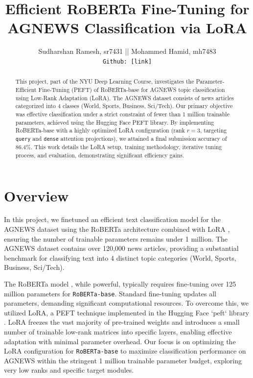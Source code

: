 \documentclass[twoside, 11pt]{article}
\begin{document}
\title{Efficient RoBERTa Fine-Tuning for AGNEWS Classification via LoRA}
\author{Sudharshan Ramesh, sr7431 ||
Mohammed Hamid, mh7483\\
\texttt{Github: [link]}
}
\maketitle

\begin{abstract}
This project, part of the NYU Deep Learning Course, investigates the Parameter-Efficient Fine-Tuning (PEFT) of RoBERTa-base for AGNEWS topic classification using Low-Rank Adaptation (LoRA). The AGNEWS dataset consists of news articles categorized into 4 classes (World, Sports, Business, Sci/Tech). Our primary objective was effective classification under a strict constraint of fewer than 1 million trainable parameters, achieved using the Hugging Face PEFT library. By implementing RoBERTa-base with a highly optimized LoRA configuration (rank $r=3$, targeting \texttt{query} and \texttt{dense} attention projections), we attained a final submission accuracy of 86.4\%. This work details the LoRA setup, training methodology, iterative tuning process, and evaluation, demonstrating significant efficiency gains.
\end{abstract}

\section{Overview}
\label{sec:intro}
In this project, we finetuned an efficient text classification model for the AGNEWS dataset using the RoBERTa architecture combined with LoRA \cite{hu2021lora} , ensuring the number of trainable parameters remains under 1 million. The AGNEWS dataset contains over 120,000 news articles, providing a substantial benchmark for classifying text into 4 distinct topic categories (World, Sports, Business, Sci/Tech).

The RoBERTa model \cite{liu2019roberta}, while powerful, typically requires fine-tuning over 125 million parameters for \texttt{RoBERTa-base}. Standard fine-tuning updates all parameters, demanding significant computational resources. To overcome this, we utilized LoRA, a PEFT technique implemented in the Hugging Face `peft` library \cite{peft}. LoRA freezes the vast majority of pre-trained weights and introduces a small number of trainable low-rank matrices into specific layers, enabling effective adaptation with minimal parameter overhead. Our focus is on optimizing the LoRA configuration for \texttt{RoBERTa-base} to maximize classification performance on AGNEWS within the stringent 1 million trainable parameter budget, exploring very low ranks and specific target modules.
\end{document}
